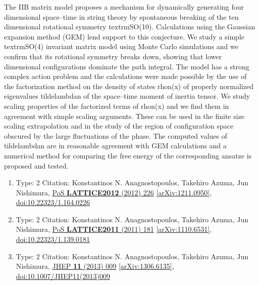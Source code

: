\documentclass[a4paper,10pt]{article}
\begin{document}
\begin{enumerate}
The IIB matrix model proposes a mechanism for dynamically generating four dimensional space--time in string theory by spontaneous breaking of the ten dimensional rotational symmetry textrm{SO}(10). Calculations using the Gaussian expansion method (GEM) lend support to this conjecture. We study a simple textrm{SO}(4) invariant matrix model using Monte Carlo simulations and we confirm that its rotational symmetry breaks down, showing that lower dimensional configurations dominate the path integral. The model has a strong complex action problem and the calculations were made possible by the use of the factorization method on the density of states rhon(x) of properly normalized eigenvalues tildelambdan of the space--time moment of inertia tensor. We study scaling properties of the factorized terms of rhon(x) and we find them in agreement with simple scaling arguments. These can be used in the finite size scaling extrapolation and in the study of the region of configuration space obscured by the large fluctuations of the phase. The computed values of tildelambdan are in reasonable agreement with GEM calculations and a numerical method for comparing the free energy of the corresponding ansatze is proposed and tested.
\begin{enumerate}
  \item Type: 2 Citation: Konstantinos N. Anagnostopoulos, Takehiro Azuma, Jun Nishimura, \href{https://www.doi.org/10.22323/1.164.0226}{PoS {\bf LATTICE2012} (2012) 226}  \href{https://arxiv.org/abs/1211.0950}{[arXiv:1211.0950]},\\\href{https://www.doi.org/10.22323/1.164.0226}{doi:10.22323/1.164.0226}
  \item Type: 2 Citation: Konstantinos N. Anagnostopoulos, Takehiro Azuma, Jun Nishimura, \href{https://www.doi.org/10.22323/1.139.0181}{PoS {\bf LATTICE2011} (2011) 181}  \href{https://arxiv.org/abs/1110.6531}{[arXiv:1110.6531]},\\\href{https://www.doi.org/10.22323/1.139.0181}{doi:10.22323/1.139.0181}
  \item Type: 2 Citation: Konstantinos N. Anagnostopoulos, Takehiro Azuma, Jun Nishimura, \href{https://www.doi.org/10.1007/JHEP11(2013)009}{JHEP {\bf 11} (2013) 009}  \href{https://arxiv.org/abs/1306.6135}{[arXiv:1306.6135]},\\\href{https://www.doi.org/10.1007/JHEP11(2013)009}{doi:10.1007/JHEP11(2013)009}

\end{enumerate}
\end{enumerate}
\end{document}
